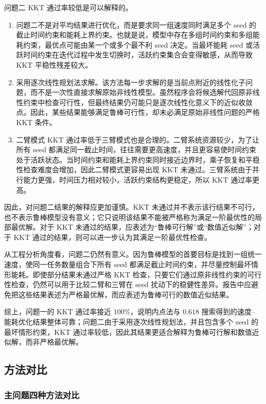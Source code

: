 问题二 KKT 通过率较低是可以解释的。
\begin{enumerate}
	\item 问题二不是对平均结果进行优化，而是要求同一组速度同时满足多个 seed 的截止时间约束和能耗上界约束。也就是说，模型中存在多组时间约束和多组能耗约束，最优点可能由某一个或多个最不利 seed 决定。当最坏能耗 seed 或活跃时间约束在迭代过程中发生切换时，活跃约束集合会变得敏感，从而导致 KKT 平稳性残差较大。

	\item 采用逐次线性规划法求解。该方法每一步求解的是当前点附近的线性化子问题，而不是一次性直接求解原始非线性模型。虽然程序会将候选解代回原非线性约束中检查可行性，但最终结果仍可能只是逐次线性化意义下的近似收敛点。因此，某些结果能够满足鲁棒可行性，却未必满足原始非线性问题的严格 KKT 条件。

	\item 二臂模式 KKT 通过率低于三臂模式也是合理的。二臂系统资源较少，为了让所有 seed 都满足同一截止时间，往往需要更高速度，并且更容易使时间约束处于活跃状态。当时间约束和能耗上界约束同时接近边界时，乘子恢复和平稳性检查难度会增加，因此二臂模式更容易出现 KKT 未通过。三臂系统由于并行能力更强，时间压力相对较小，活跃约束结构更稳定，所以 KKT 通过率更高。
\end{enumerate}

因此，对问题二结果的解释应更加谨慎。KKT 未通过并不表示该行结果不可行，也不表示鲁棒模型没有意义；它只说明该结果不能被严格称为满足一阶最优性的局部最优解。对于 KKT 未通过的结果，应表述为“鲁棒可行解”或“数值近似解”；对于 KKT 通过的结果，则可以进一步认为其满足一阶最优性检查。

从工程分析角度看，问题二仍然有意义。因为鲁棒模型的首要目标是找到一组统一速度，使同一任务数量组合下所有 seed 都满足截止时间约束，并尽量控制最坏情形能耗。即使部分结果未通过严格 KKT 检查，只要它们通过原非线性约束的可行性检查，仍然可以用于比较二臂和三臂在 seed 扰动下的稳健性差异。报告中应避免把这些结果表述为严格最优解，而应表述为鲁棒可行的数值近似结果。

综上，问题一的 KKT 通过率接近 $100\%$，说明内点法与 $0.618$ 搜索得到的速度--能耗优化结果整体可靠；问题二由于采用逐次线性规划法，并且包含多个 seed 的最坏情形约束，KKT 通过率较低，因此其结果更适合解释为鲁棒可行解和数值近似解，而非严格最优解。


\subsection{方法对比}

\subsubsection{主问题四种方法对比}


